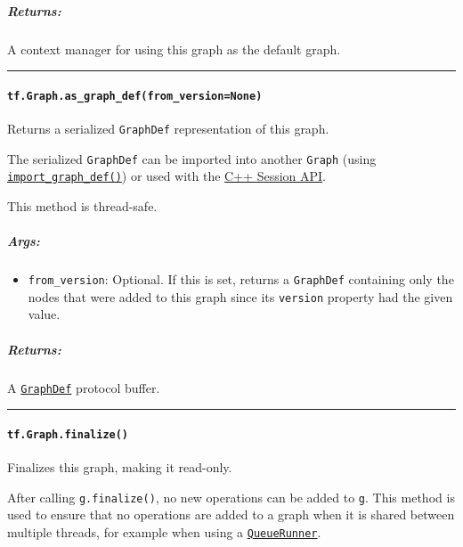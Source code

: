 \subparagraph{Returns: }\label{returns}

A context manager for using this graph as the default graph.

\begin{center}\rule{0.5\linewidth}{\linethickness}\end{center}

\paragraph{\texorpdfstring{\lstinline{tf.Graph.as_graph_def(from_version=None)}
}{tf.Graph.as_graph_def(from_version=None) }}\label{tf.graph.asux5fgraphux5fdeffromux5fversionnone}

Returns a serialized \lstinline{GraphDef} representation of this graph.

The serialized \lstinline{GraphDef} can be imported into another
\lstinline{Graph} (using
\protect\hyperlink{importux5fgraphux5fdef}{\lstinline{import_graph_def()}})
or used with the \href{../../api_docs/cc/index.md}{C++ Session API}.

This method is thread-safe.

\subparagraph{Args: }\label{args}

\begin{itemize}
\tightlist
\item
  \lstinline{from_version}: Optional. If this is set, returns a
  \lstinline{GraphDef} containing only the nodes that were added to this
  graph since its \lstinline{version} property had the given value.
\end{itemize}

\subparagraph{Returns: }\label{returns-1}

A
\href{https://tensorflow.googlesource.com/tensorflow/+/master/tensorflow/core/framework/graph.proto}{\lstinline{GraphDef}}
protocol buffer.

\begin{center}\rule{0.5\linewidth}{\linethickness}\end{center}

\paragraph{\texorpdfstring{\lstinline{tf.Graph.finalize()}
}{tf.Graph.finalize() }}\label{tf.graph.finalize}

Finalizes this graph, making it read-only.

After calling \lstinline{g.finalize()}, no new operations can be added to
\lstinline{g}. This method is used to ensure that no operations are added
to a graph when it is shared between multiple threads, for example when
using a
\href{../../api_docs/python/train.md\#QueueRunner}{\lstinline{QueueRunner}}.

